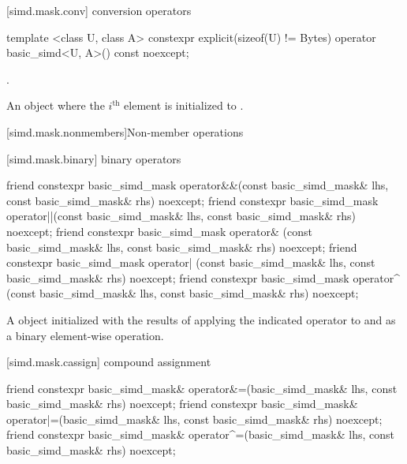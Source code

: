 [simd.mask.conv]{ conversion operators}

\begin{itemdecl}
template <class U, class A>
  constexpr explicit(sizeof(U) != Bytes) operator basic_simd<U, A>() const noexcept;
\end{itemdecl}

\begin{itemdescr}
  \pnum\constraints
  .

  \pnum\returns
  An object where the $i^\text{th}$ element is initialized to
  .
\end{itemdescr}

[simd.mask.nonmembers]{Non-member operations}

[simd.mask.binary]{ binary operators}

\begin{itemdecl}
friend constexpr basic_simd_mask
  operator&&(const basic_simd_mask& lhs, const basic_simd_mask& rhs) noexcept;
friend constexpr basic_simd_mask
  operator||(const basic_simd_mask& lhs, const basic_simd_mask& rhs) noexcept;
friend constexpr basic_simd_mask
  operator& (const basic_simd_mask& lhs, const basic_simd_mask& rhs) noexcept;
friend constexpr basic_simd_mask
  operator| (const basic_simd_mask& lhs, const basic_simd_mask& rhs) noexcept;
friend constexpr basic_simd_mask
  operator^ (const basic_simd_mask& lhs, const basic_simd_mask& rhs) noexcept;
\end{itemdecl}

\begin{itemdescr}
  \pnum\returns
  A  object initialized with the results of applying the indicated operator
  to  and  as a binary element-wise operation.
\end{itemdescr}

[simd.mask.cassign]{ compound assignment}

\begin{itemdecl}
friend constexpr basic_simd_mask&
  operator&=(basic_simd_mask& lhs, const basic_simd_mask& rhs) noexcept;
friend constexpr basic_simd_mask&
  operator|=(basic_simd_mask& lhs, const basic_simd_mask& rhs) noexcept;
friend constexpr basic_simd_mask&
  operator^=(basic_simd_mask& lhs, const basic_simd_mask& rhs) noexcept;
\end{itemdecl}

